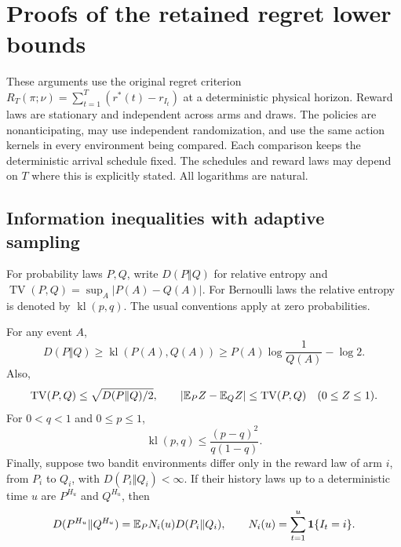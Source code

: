 \section{Proofs of the retained regret lower bounds}
\label{app:retained_regret_lower_bounds}

These arguments use the original regret criterion
$R_T(\pi;\nu)=\sum_{t=1}^T(r^*(t)-r_{I_t})$ at a deterministic physical
horizon. Reward laws are stationary and independent across arms and draws.
The policies are nonanticipating, may use independent randomization, and
use the same action kernels in every environment being compared. Each
comparison keeps the deterministic arrival schedule fixed. The schedules
and reward laws may depend on $T$ where this is explicitly stated. All
logarithms are natural.

\subsection{Information inequalities with adaptive sampling}

For probability laws $P,Q$, write $D(P\Vert Q)$ for relative entropy and
$\operatorname{TV}(P,Q)=\sup_A|P(A)-Q(A)|$. For Bernoulli laws the relative
entropy is denoted by $\operatorname{kl}(p,q)$. The usual conventions apply
at zero probabilities.

\begin{lemma}
\label{lem:retained_information}
For any event $A$,
\begin{equation}
 D(P\Vert Q)\ge\operatorname{kl}(P(A),Q(A))
       \ge P(A)\log\frac1{Q(A)}-\log2.
 \label{eq:retained_binary_information}
\end{equation}
Also,
\begin{equation}
 \operatorname{TV}(P,Q)\le\sqrt{D(P\Vert Q)/2},\qquad
 |\mathbb E_P Z-\mathbb E_Q Z|\le\operatorname{TV}(P,Q)\quad(0\le Z\le1).
 \label{eq:retained_tv_information}
\end{equation}
For $0<q<1$ and $0\le p\le1$,
\begin{equation}
 \operatorname{kl}(p,q)\le\frac{(p-q)^2}{q(1-q)}.
 \label{eq:retained_bernoulli_upper}
\end{equation}
Finally, suppose two bandit environments differ only in the reward law
of arm $i$, from $P_i$ to $Q_i$, with $D(P_i\Vert Q_i)<\infty$. If their
history laws up to a deterministic time $u$ are $P^{H_u}$ and $Q^{H_u}$,
then
\begin{equation}
 D(P^{H_u}\Vert Q^{H_u})
       =\mathbb E_P N_i(u)D(P_i\Vert Q_i),\qquad
 N_i(u)=\sum_{t=1}^u\mathbf 1\{I_t=i\}.
 \label{eq:retained_adaptive_kl}
\end{equation}
\end{lemma}

